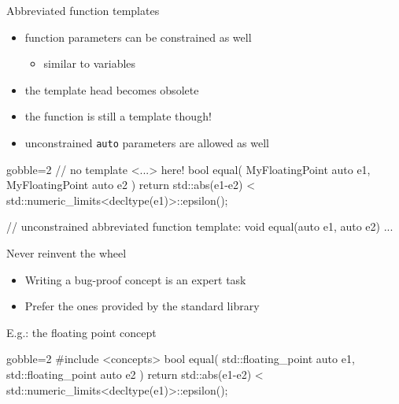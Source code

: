 \begin{frame}[fragile]
    \begin{block}{Abbreviated function templates}
      \begin{itemize}
        \item function parameters can be constrained as well
        \begin{itemize}
          \item similar to variables
        \end{itemize}
        \item the template head becomes obsolete
        \item the function is still a template though!
        \item unconstrained \texttt{auto} parameters are allowed as well
      \end{itemize}
    \end{block}
    \begin{exampleblock}{}
      \small
      \begin{cppcode*}{gobble=2}
      // no template <...> here!
      bool equal( MyFloatingPoint auto e1,
                  MyFloatingPoint auto e2 ) {
        return std::abs(e1-e2) <
               std::numeric_limits<decltype(e1)>::epsilon();
      }

      // unconstrained abbreviated function template:
      void equal(auto e1, auto e2) { ... }
      \end{cppcode*}
    \end{exampleblock}
\end{frame}

\begin{frame}[fragile]
    \begin{block}{Never reinvent the wheel}
      \begin{itemize}
        \item Writing a bug-proof concept is an expert task
        \item Prefer the ones provided by the standard library
      \end{itemize}
    \end{block}
    \begin{exampleblock}{E.g.: the floating point concept}
      \small
      \begin{cppcode*}{gobble=2}
      #include <concepts>
      bool equal( std::floating_point auto e1,
                  std::floating_point auto e2 ) {
        return std::abs(e1-e2) <
               std::numeric_limits<decltype(e1)>::epsilon();
      }
      \end{cppcode*}
    \end{exampleblock}
\end{frame}

